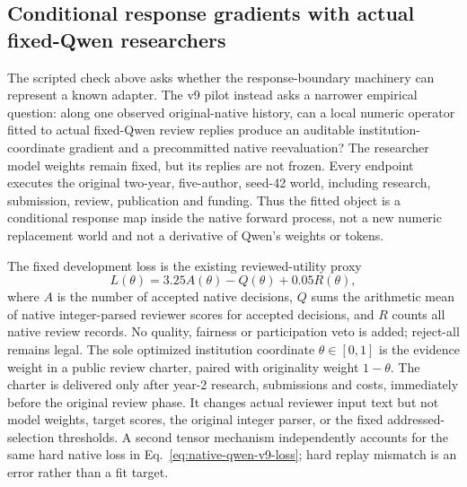 \subsection{Conditional response gradients with actual fixed-Qwen researchers}
\label{sec:native-qwen-response-v9}

The scripted check above asks whether the response-boundary machinery can
represent a known adapter.  The v9 pilot instead asks a narrower empirical
question: along one observed original-native history, can a local numeric
operator fitted to actual fixed-Qwen review replies produce an auditable
institution-coordinate gradient and a precommitted native reevaluation?  The
researcher model weights remain fixed, but its replies are not frozen.  Every
endpoint executes the original two-year, five-author, seed-42 world, including
research, submission, review, publication and funding.  Thus the fitted object
is a conditional response map inside the native forward process, not a new
numeric replacement world and not a derivative of Qwen's weights or tokens.

The fixed development loss is the existing reviewed-utility proxy
\begin{equation}
  L(\theta)=3.25A(\theta)-Q(\theta)+0.05R(\theta),
  \label{eq:native-qwen-v9-loss}
\end{equation}
where $A$ is the number of accepted native decisions, $Q$ sums the arithmetic
mean of native integer-parsed reviewer scores for accepted decisions, and $R$ counts all native
review records.  No quality, fairness or participation veto is added; reject-all
remains legal.  The sole optimized institution coordinate $\theta\in[0,1]$ is
the evidence weight in a public review charter, paired with originality weight
$1-\theta$.  The charter is delivered only after year-2 research, submissions
and costs, immediately before the original review phase.  It changes actual
reviewer input text but not model weights, target scores, the original integer
parser, or the fixed addressed-selection thresholds.  A second tensor
mechanism independently accounts for the same hard native loss in
Eq.~\eqref{eq:native-qwen-v9-loss}; hard replay mismatch is an error rather than
a fit target.


